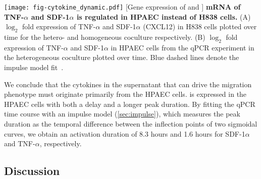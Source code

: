 \begin{center}
\captionsetup{labelformat=prepage}
\texttt{[image: fig-cytokine\_dynamic.pdf]}
\newpage
[Gene expression of \tnfa and \sdfonea]{
{\bf mRNA of TNF-$\alpha$ and SDF-1$\alpha$ is regulated in HPAEC instead of H838 
cells.}
(A) $\log_2$ fold expression of TNF-$\alpha$ and SDF-1$\alpha$ (CXCL12) in H838 
cells plotted
over time for the hetero- and homogeneous coculture respectively.
(B) $\log_2$ fold expression of TNF-$\alpha$ and SDF-1$\alpha$ in HPAEC cells 
from the qPCR
experiment in the heterogeneous coculture plotted
over time. Blue dashed lines denote the impulse model fit~\cite{Chechik2009}.
}
\label{fig:cytokine_dynamic}
\end{center}


We conclude that the cytokines in the supernatant that can drive the migration
phenotype
must originate primarily from the HPAEC cells.  
\sdfonea is expressed in the HPAEC cells with both a delay and a longer peak duration.
By fitting the qPCR time course with an impulse model 
(\ref{sec:impulse}), which measures the peak 
duration as the 
temporal difference between the inflection points of two
sigmoidal curves, 
we obtain an activation duration of  8.3 hours and 1.6 hours for SDF-1$\alpha$
and TNF-$\alpha$, respectively.

\subsection{Discussion}

